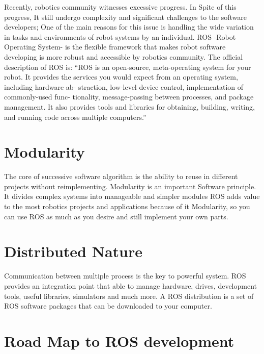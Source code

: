 
Recently, robotics community witnesses excessive progress. In Spite of this progress, It still undergo complexity and significant challenges to the software developers; One of the main reasons for this issue is  handling the wide variation in tasks and environments of robot systems by an individual. 
ROS -Robot Operating System- is the flexible framework that makes robot software developing is more robust and accessible by robotics community. The official description of ROS is:
``ROS is an open-source, meta-operating system for your robot. It provides the
	services you would expect from an operating system, including hardware ab-
	straction, low-level device control, implementation of commonly-used func-
	tionality, message-passing between processes, and package management. It
	also provides tools and libraries for obtaining, building, writing, and running
	code across multiple computers.''

\section{Modularity}
The core of successive software algorithm is the ability to reuse in different projects without reimplementing. Modularity is an important Software principle. It divides complex systems into manageable and simpler modules 
ROS adds value to the most robotics projects and applications because of it Modularity, so you can use ROS as much as you desire and still implement your own parts.
\section{Distributed Nature }
Communication between multiple process  is the key to powerful system. ROS provides an integration point that able to manage hardware, drives, development tools, useful libraries, simulators and much more. 
A ROS distribution is a set of ROS software packages that can be downloaded
to your computer.


\section{Road Map to ROS development}
